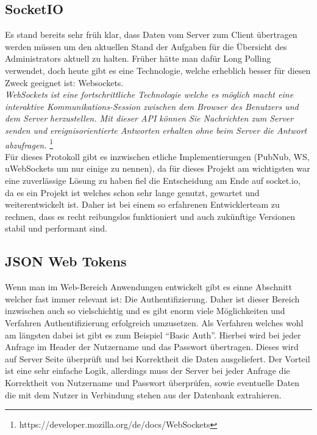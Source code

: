 \subsection{SocketIO}

Es stand bereits sehr früh klar, dass Daten vom Server zum Client übertragen werden müssen um den aktuellen Stand der Aufgaben für die Übersicht des Administrators aktuell zu halten. Früher hätte man dafür Long Polling verwendet, doch heute gibt es eine Technologie, welche erheblich besser für diesen Zweck geeignet ist: Websockets. \\

\emph{\glqq   
WebSockets ist eine fortschrittliche Technologie welche es möglich macht eine interaktive Kommunikations-Session zwischen dem Browser des Benutzers und dem Server herzustellen. Mit dieser API können Sie Nachrichten zum Server senden und ereignisorientierte Antworten erhalten ohne beim Server die Antwort abzufragen.
\grqq} \footnote{https://developer.mozilla.org/de/docs/WebSockets} \\


Für dieses Protokoll gibt es inzwischen etliche Implementierungen (PubNub, WS, uWebSockets um nur einige zu nennen), da für dieses Projekt am wichtigsten war eine zuverlässige Lösung zu haben fiel die Entscheidung am Ende auf socket.io, da es ein Projekt ist welches schon sehr lange genutzt, gewartet und weiterentwickelt ist. Daher ist bei einem so erfahrenen Entwicklerteam zu rechnen, dass es recht reibungslos funktioniert und auch zukünftige Versionen stabil und performant sind.

\subsection{JSON Web Tokens} \label{JWT}

Wenn man im Web-Bereich Anwendungen entwickelt gibt es einne Abschnitt welcher fast immer relevant ist: Die Authentifizierung. Daher ist dieser Bereich inzwischen auch so vielschichtig und es gibt enorm viele Möglichkeiten und Verfahren Authentifizierung erfolgreich umzusetzen. Als Verfahren welches wohl am längsten dabei ist gibt es zum Beispiel ``Basic Auth''. Hierbei wird bei jeder Anfrage im Header der Nutzername und das Passwort übertragen. Dieses wird auf Server Seite überprüft und bei Korrektheit die Daten ausgeliefert. Der Vorteil ist eine sehr einfache Logik, allerdings muss der Server bei jeder Anfrage die Korrektheit von Nutzername und Passwort überprüfen, sowie eventuelle Daten die mit dem Nutzer in Verbindung stehen aus der Datenbank extrahieren. \\

